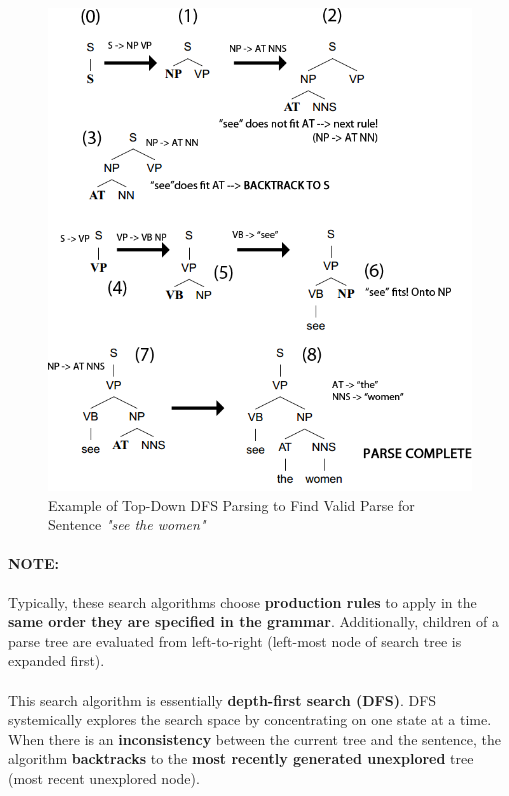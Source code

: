 \documentclass{article}
\begin{document}
\begin{figure}
	\centering
	\includegraphics[scale=0.4]{figures/top-down-parsing-example.png}
	\caption{Example of Top-Down DFS Parsing to Find Valid Parse for Sentence \textit{"see the women"}}
	\label{fig:top-down-parsing}
\end{figure}

\paragraph{\textbf{NOTE: }} Typically, these search algorithms choose \textbf{production rules} to apply in the \textbf{same order they are specified in the grammar}. Additionally, children of a parse tree are evaluated from left-to-right (left-most node of search tree is expanded first). 
\paragraph{}

This search algorithm is essentially \textbf{depth-first search (DFS)}. DFS systemically explores the search space by concentrating on one state at a time. When there is an \textbf{inconsistency} between the current tree and the sentence, the algorithm \textbf{backtracks} to the \textbf{most recently generated unexplored} tree (most recent unexplored node).
\end{document}
